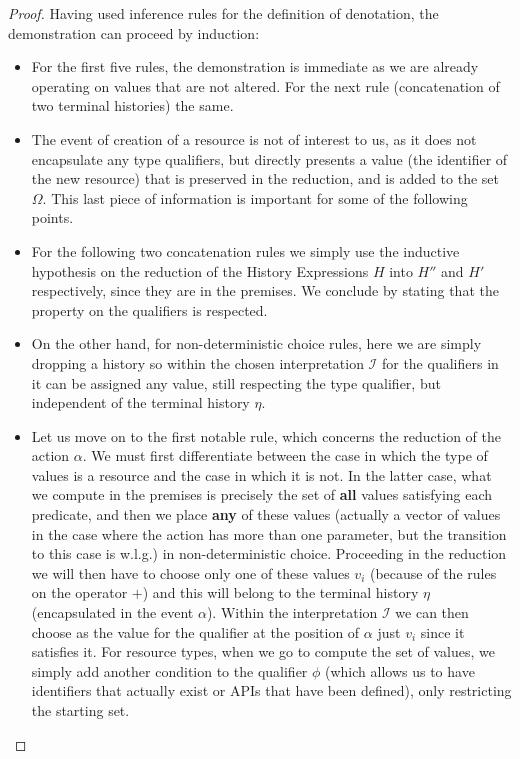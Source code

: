 \begin{proof}
    Having used inference rules for the definition of denotation, the demonstration can proceed by induction:
    \begin{itemize}
        \item For the first five rules, the demonstration is immediate as we are already operating on values that are not altered. For the next rule (concatenation of two terminal histories) the same.
        \item The event of creation of a resource is not of interest to us, as it does not encapsulate any type qualifiers, but directly presents a value (the identifier of the new resource) that is preserved in the reduction, and is added to the set $\Omega$. This last piece of information is important for some of the following points.
        \item For the following two concatenation rules we simply use the inductive hypothesis on the reduction of the History Expressions $H$ into $H''$ and $H'$ respectively, since they are in the premises. We conclude by stating that the property on the qualifiers is respected.
        \item On the other hand, for non-deterministic choice rules, here we are simply dropping a history so within the chosen interpretation $\mathcal{I}$ for the qualifiers in it can be assigned any value, still respecting the type qualifier, but independent of the terminal history $\eta$.
        \item Let us move on to the first notable rule, which concerns the reduction of the action $\alpha$. We must first differentiate between the case in which the type of values is a resource and the case in which it is not. In the latter case, what we compute in the premises is precisely the set of \textbf{all} values satisfying each predicate, and then we place \textbf{any} of these values (actually a vector of values in the case where the action has more than one parameter, but the transition to this case is w.l.g.) in non-deterministic choice. Proceeding in the reduction we will then have to choose only one of these values $v_i$ (because of the rules on the operator $+$) and this will belong to the terminal history $\eta$ (encapsulated in the event $\alpha$). Within the interpretation $\mathcal{I}$ we can then choose as the value for the qualifier at the position of $\alpha$ just $v_i$ since it satisfies it. For resource types, when we go to compute the set of values, we simply add another condition to the qualifier $\phi$ (which allows us to have identifiers that actually exist or APIs that have been defined), only restricting the starting set.


\end{itemize}
\end{proof}

